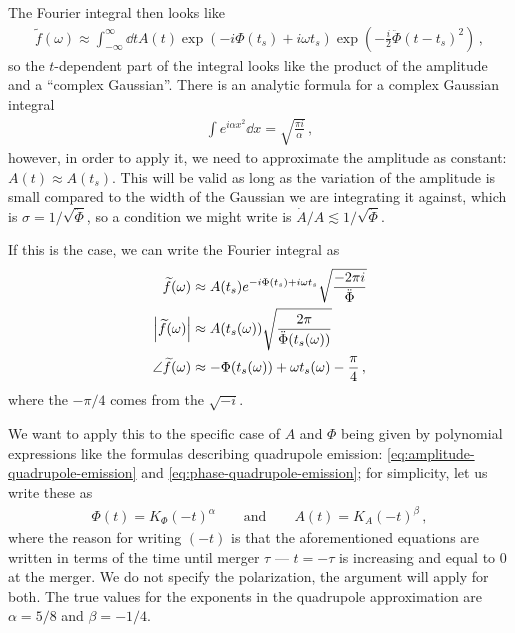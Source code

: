 \documentclass[main.tex]{subfiles}
\begin{document}
The Fourier integral then looks like 
%
\begin{align}
\widetilde{f}(\omega ) \approx \int_{-\infty }^{\infty } \dd{t} A(t) \exp(-i \Phi (t_s) + i \omega t_s) \exp(- \frac{i}{2} \ddot{\Phi} (t-t_s)^2)
\,,
\end{align}
%
so the \(t\)-dependent part of the integral looks like the product of the amplitude and a ``complex Gaussian''. There is an analytic formula for a complex Gaussian integral 
%
\begin{align}
\int e^{i \alpha x^2} \dd{x} = \sqrt{\frac{\pi i}{\alpha }}
\,,
\end{align}
%
however, in order to apply it, we need to approximate the amplitude as constant: \(A(t) \approx A(t_s)\). This will be valid as long as the variation of the amplitude is small compared to the width of the Gaussian we are integrating it against, which is \(\sigma = 1 / \sqrt{\ddot{\Phi}}\), so a condition we might write is \(\dot{A} / A \lesssim 1/ \sqrt{\ddot{\Phi}}\).

If this is the case, we can write the Fourier integral as 
%
\begin{align}
\widetilde{f}(\omega ) &\approx A(t_s) e^{- i \Phi (t_s) + i \omega t_s} \sqrt{\frac{- 2 \pi i}{\ddot{\Phi}}}   \\
\abs{\widetilde{f}(\omega )} &\approx A(t_s (\omega )) \sqrt{\frac{2 \pi }{\ddot{\Phi} (t_s (\omega ))}}  \\
\angle \widetilde{f}(\omega ) &\approx - \Phi (t_s (\omega )) + \omega t_s (\omega ) - \frac{\pi}{4}
\,,
\end{align}
%
where the \(- \pi /4\) comes from the \(\sqrt{-i}\). 

We want to apply this to the specific case of \(A\) and \(\Phi \) being given by polynomial expressions like the formulas describing quadrupole emission: \eqref{eq:amplitude-quadrupole-emission} and \eqref{eq:phase-quadrupole-emission}; for simplicity, let us write these as 
%
\begin{align}
\Phi (t) = K_\Phi (- t)^{\alpha }
\qquad \text{and} \qquad
A(t) = K_A (-t)^{\beta }
\,,
\end{align}
%
where the reason for writing \((-t)\) is that the aforementioned equations are written in terms of the time until merger \(\tau \) --- \(t = -\tau \) is increasing and equal to 0 at the merger.
We do not specify the polarization, the argument will apply for both. 
The true values for the exponents in the quadrupole approximation are \(\alpha = 5/8\) and \(\beta = -1/4\). 
\end{document}
